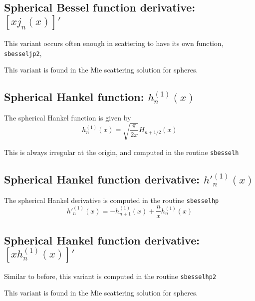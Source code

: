\clearpage
{}
\subsection{Spherical Bessel function derivative: $[xj_n(x)]'$}

This variant occurs often enough in scattering to have its own function, \texttt{sbesseljp2}, 

This variant is found in the Mie scattering solution for spheres.

{\footnotesize
{}
}


\subsection{Spherical Hankel function: $h_n^{(1)}(x)$}

The spherical Hankel function is given by 
\begin{equation}
h_n^{(1)}(x) = \sqrt{\dfrac{\pi}{2x}}H_{n+1/2}(x)
\end{equation}

This is always irregular at the origin, and computed in the routine \texttt{sbesselh}

{\footnotesize
{}
}

\subsection{Spherical Hankel function derivative: ${h'}_n^{(1)}(x)$}

The spherical Hankel derivative is computed in the routine \texttt{sbesselhp}
\begin{equation}
{h'}_n^{(1)}(x) = -h_{n+1}^{(1)}(x) + \dfrac{n}{x}h_n^{(1)}(x)
\end{equation}


{\footnotesize
{}
}

\subsection{Spherical Hankel function derivative: $[xh_n^{(1)}(x)]'$}

Similar to before, this variant is computed in the routine \texttt{sbesselhp2}

This variant is found in the Mie scattering solution for spheres.


{\footnotesize
{}
}

